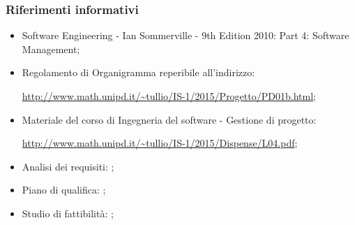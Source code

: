 \documentclass[../PianoProgetto.tex]{subfiles}
\begin{document}
		\subsubsection{Riferimenti informativi}
		\begin{itemize}
		\item Software Engineering - Ian Sommerville - 9th Edition 2010:  Part 4: Software Management;
		\item Regolamento di Organigramma reperibile all'indirizzo: \par
			\url{http://www.math.unipd.it/~tullio/IS-1/2015/Progetto/PD01b.html};
		\item Materiale del corso di Ingegneria del software - Gestione di progetto: \par
			\url{http://www.math.unipd.it/~tullio/IS-1/2015/Dispense/L04.pdf};
		\item Analisi dei requisiti: \analisideirequisitiv ;
		\item Piano di qualifica: \pianodiqualificav ;
		\item Studio di fattibilità: \studiodifattibilitav ;
		\end{itemize}
			
\end{document}
